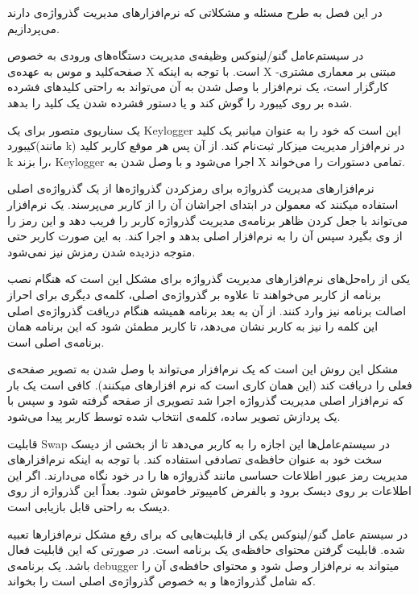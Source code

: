 
در این فصل به طرح مسئله و مشکلاتی که نرم‌‌افزارهای مدیریت گذرواژه‌ی دارند می‌پردازیم.


در سیستم‌عامل گنو/لینوکس وظیفه‌ی مدیریت دستگاه‌های ورودی به خصوص صفحه‌کلید و موس به عهده‌ی X است. با توجه به اینکه X مبتنی بر معماری مشتری-کارگزار است، یک نرم‌افزار با وصل شدن به آن می‌تواند به راحتی کلید‌های فشرده شده بر روی کیبورد را گوش کند و یا دستور فشرده شدن یک کلید را بدهد. 

یک سناریوی متصور برای یک Keylogger این است که خود را به عنوان میانبر یک کلید کیبورد(مانند k) در نرم‌افزار مدیریت میزکار ثبت‌نام کند. از آن پس هر موقع کاربر کلید k را بزند، Keylogger اجرا می‌شود و با وصل شدن به X تمامی دستورات را می‌خواند.


نرم‌افزارهای مدیریت گذرواژه برای رمزکردن گذرواژه‌ها از یک گذرواژه‌ی اصلی استفاده میکنند که معمولن در ابتدای اجراشان آن را از کاربر می‌پرسند. یک نرم‌افزار می‌تواند با جعل کردن ظاهر برنامه‌ی مدیریت گذرواژه کاربر را فریب دهد و این رمز را از وی بگیرد سپس آن را به نرم‌افزار اصلی بدهد و اجرا کند. به این صورت کاربر حتی متوجه دزدیده شدن رمزش نیز نمی‌شود.


یکی از راه‌حل‌های نرم‌افزارهای مدیریت گذرواژه برای مشکل  این است که هنگام نصب برنامه از کاربر می‌خواهند تا علاوه بر گذرواژه‌ی اصلی، کلمه‌ی دیگری برای احراز اصالت برنامه نیز وارد کنند. از آن به بعد برنامه همیشه هنگام دریافت گذرواژه‌ی اصلی این کلمه را نیز به کاربر نشان می‌دهد، تا کاربر مطمئن شود که این برنامه همان برنامه‌ی اصلی است.

مشکل این روش این است که یک نرم‌افزار می‌تواند با وصل شدن به  تصویر صفحه‌ی فعلی را دریافت کند (این همان کاری است که نرم افزارهای  میکنند). کافی است یک بار که نرم‌افزار اصلی مدیریت گذرواژه اجرا شد تصویری از صفحه گرفته شود و سپس با یک پردازش تصویر ساده، کلمه‌ی انتخاب شده توسط کاربر پیدا می‌شود.


قابلیت Swap در سیستم‌عامل‌ها این اجازه را به کاربر می‌دهد تا از بخشی از دیسک سخت خود به عنوان حافظه‌ی تصادفی استفاده کند. با توجه به اینکه نرم‌افزارهای مدیریت رمز عبور اطلاعات حساسی مانند گذرواژه ها را در خود نگاه می‌دارند. اگر این اطلاعات بر روی دیسک برود و بالفرض کامپیوتر خاموش شود. بعداً این گذرواژه از روی دیسک به راحتی قابل بازیابی است.


در سیستم عامل گنو/لینوکس یکی از قابلیت‌هایی که برای رفع مشکل نرم‌افزارها تعبیه شده. قابلیت گرفتن محتوای حافظه‌ی یک برنامه است. در صورتی که این قابلیت فعال باشد. یک برنامه‌ی debugger میتواند به نرم‌افزار وصل شود و محتوای حافظه‌ی آن را که شامل گذرواژه‌ها و به خصوص گذرواژه‌ی اصلی است را بخواند.

